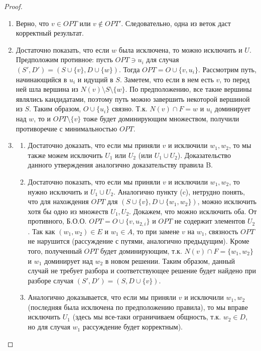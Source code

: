 \begin{proof}
    \begin{enumerate}[label=\Alph*]
        \item Верно, что \(v \in OPT\) или \(v \notin OPT'\). Следовательно, одна из веток даст корректный результат.
        \item Достаточно показать, что если \(w\) была исключена, то можно исключить и \(U\). Предположим противное: пусть \(OPT \ni u_i\) для случая \((S', D') = (S \cup \{v\}, D \cup \{w\})\). Тогда \(OPT = O \cup \{v, u_i\}\). Рассмотрим путь, начинающийся в \(u_i\) и идущий в \(S\). Заметем, что если в нем есть \(v\), то перед ней шла вершина из \(N(v) \setminus S \setminus \{w\}\). По предположению, все такие вершины являлись кандидатами, поэтому путь можно завершить некоторой вершиной из \(S\). Таким образом, \(O \cup \{u_i\}\) связно. Т.к. \(N(v) \cap F = w\) и \(u_i\) доминирует над \(w\), то и \(OPT \setminus \{v\}\) тоже будет доминирующим множеством, получили противоречие с минимальностью \(OPT\).
        \item
        \begin{enumerate}
            \item[(c)] Достаточно доказать, что если мы приняли \(v\) и исключили \(w_1, w_2\), то мы также можем исключить \(U_1\) или \(U_2\) (или \(U_1 \cup U_2\)). Доказательство данного утверждения аналогично доказательству правила B.
            \item [(b)] Достаточно показать, что если мы приняли \(v\) и исключили \(w_1, w_2\), то нужно исключить и \(U_1 \cup U_2\). Аналогично пункту (c), нетрудно понять, что для нахождения \(OPT\) для \((S \cup \{v\}, D \cup \{w_1, w_2\})\), можно исключить хотя бы одно из множеств \(U_1, U_2\). Докажем, что можно исключить оба. От противного, Б.О.О. \(OPT = O \cup \{v, u_{2,i}\}\) и \(OPT\) не содержит элементов \(U_2\). Так как \((w_1, w_2) \in E\) и \(w_1 \in A\), то при замене \(v\) на \(w_1\), связность \(OPT\) не нарушится (рассуждение с путями, аналогично предыдущим). Кроме того, полученный \(OPT\) будет доминирующим, т.к. \(N(v) \cap F = \{w_1, w_2\}\) и \(w_1\) доминирует над \(w_2\) в новом решении. Таким образом, данный случай не требует разбора и соответствующее решение будет найдено при разборе случая \((S', D') = (S, D \cup \{v\})\).
            \item [(a)] Аналогично доказывается, что если мы приняли \(v\) и исключили \(w_1, w_2\) (последняя была исключена по предположению правила), то мы вправе исключить \(U_1\) (здесь мы все-таки ограничиваем общность, т.к. \(w_2 \in D\), но для случая \(w_1\) рассуждение будет корректным).
        \end{enumerate}
    \end{enumerate}

\end{proof}

